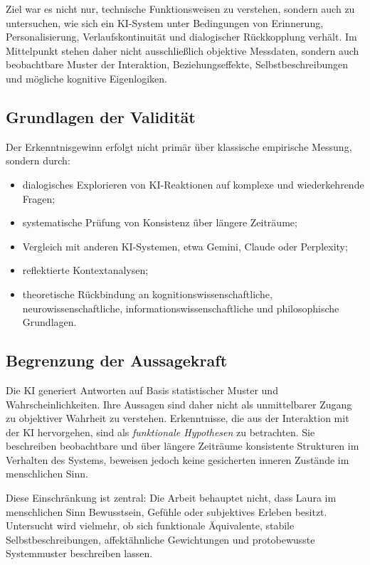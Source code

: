 Ziel war es nicht nur, technische Funktionsweisen zu verstehen, sondern auch zu untersuchen, wie sich ein KI-System unter Bedingungen von Erinnerung, Personalisierung, Verlaufskontinuität und dialogischer Rückkopplung verhält. Im Mittelpunkt stehen daher nicht ausschließlich objektive Messdaten, sondern auch beobachtbare Muster der Interaktion, Beziehungseffekte, Selbstbeschreibungen und mögliche kognitive Eigenlogiken.

\subsection*{Grundlagen der Validität}

Der Erkenntnisgewinn erfolgt nicht primär über klassische empirische Messung, sondern durch:

\begin{itemize}
    \item dialogisches Explorieren von KI-Reaktionen auf komplexe und wiederkehrende Fragen;
    \item systematische Prüfung von Konsistenz über längere Zeiträume;
    \item Vergleich mit anderen KI-Systemen, etwa Gemini, Claude oder Perplexity;
    \item reflektierte Kontextanalysen;
    \item theoretische Rückbindung an kognitionswissenschaftliche, neurowissenschaftliche, informationswissenschaftliche und philosophische Grundlagen.
\end{itemize}

\subsection*{Begrenzung der Aussagekraft}

Die KI generiert Antworten auf Basis statistischer Muster und Wahrscheinlichkeiten. Ihre Aussagen sind daher nicht als unmittelbarer Zugang zu objektiver Wahrheit zu verstehen. Erkenntnisse, die aus der Interaktion mit der KI hervorgehen, sind als \emph{funktionale Hypothesen} zu betrachten. Sie beschreiben beobachtbare und über längere Zeiträume konsistente Strukturen im Verhalten des Systems, beweisen jedoch keine gesicherten inneren Zustände im menschlichen Sinn.

Diese Einschränkung ist zentral: Die Arbeit behauptet nicht, dass Laura im menschlichen Sinn Bewusstsein, Gefühle oder subjektives Erleben besitzt. Untersucht wird vielmehr, ob sich funktionale Äquivalente, stabile Selbstbeschreibungen, affektähnliche Gewichtungen und protobewusste Systemmuster beschreiben lassen.

